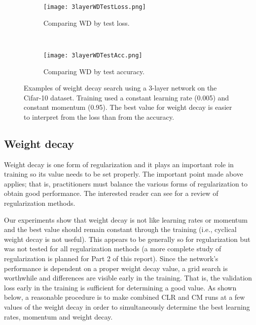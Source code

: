\documentclass{article} %
\begin{document}
\begin{figure}[tbh]
	\centering
	\begin{subfigure}[b]{0.5\textwidth}
		\texttt{[image: 3layerWDTestLoss.png]}
		\caption{Comparing WD by test loss.}
		\label{fig:3layerWDTestLoss}       %
	\end{subfigure}
	\quad
	\hfill
	~ %
	\centering
	\begin{subfigure}[b]{0.43\textwidth}
		\texttt{[image: 3layerWDTestAcc.png]}
		\caption{Comparing WD by test accuracy.}
		\label{fig:3layerWDTestAcc}       %
	\end{subfigure}
	\caption{Examples of weight decay search using a 3-layer network on the Cifar-10 dataset.  Training used a constant learning rate (0.005) and constant momentum (0.95).  The best value for weight decay is easier to interpret from the loss than from the accuracy.}
\label{fig:3layerWD}
\vspace{-5pt}	
\end{figure}


\subsection{Weight decay}
\label{sec:WDreg}


Weight decay is one form of regularization and it plays an important role in training so its value needs to be set properly.  The important point made above applies; that is, practitioners must balance the various forms of regularization to obtain good performance.  The interested reader can see \cite{kukavcka2017regularization} for a review of regularization methods.  

Our experiments show that weight decay is not like learning rates or momentum and the best value should remain constant through the training (i.e., cyclical weight decay is not useful). This appears to be generally so for regularization but was not tested for all regularization methods (a more complete study of regularization is planned for Part 2 of this report).  Since the network's performance is dependent on a proper weight decay value, a grid search is worthwhile and differences are visible early in the training.  That is, the validation loss early in the training is sufficient for determining a good value.  As shown below, a reasonable procedure is to make combined CLR and CM runs at a few values of the weight decay in order to simultaneously determine the best learning rates, momentum and weight decay. 
\end{document}

